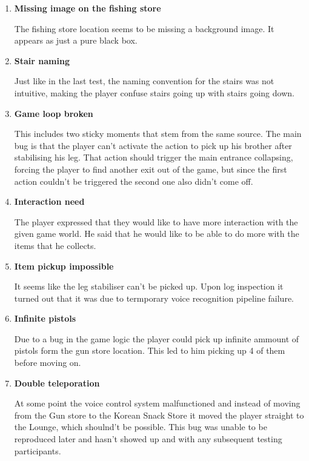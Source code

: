\begin{enumerate}
    \item \textbf{Missing image on the fishing store}
    
    The fishing store location seems to be missing a background image. It appears as just a pure black box.

    \item \textbf{Stair naming}
    
    Just like in the last test, the naming convention for the stairs was not intuitive, making the player confuse stairs going up with stairs going down.


    \item \textbf{Game loop broken}
    
    This includes two sticky moments that stem from the same source. The main bug is that the player can't activate the action to pick up his brother after stabilising his leg. That action should trigger the main entrance collapsing, forcing the player to find another exit out of the game, but since the first action couldn't be triggered the second one also didn't come off. 


    \item \textbf{Interaction need}
    
    The player expressed that they would like to have more interaction with the given game world. He said that he would like to be able to do more with the items that he collects. 



    \item \textbf{Item pickup impossible}
    
    It seems like the leg stabiliser can't be picked up. Upon log inspection it turned out that it was due to termporary voice recognition pipeline failure.


    \item \textbf{Infinite pistols}
    
    Due to a bug in the game logic the player could pick up infinite ammount of pistols form the gun store location. This led to him picking up 4 of them before moving on.


    \item \textbf{Double teleporation}
    
    At some point the voice control system malfunctioned and instead of moving from the Gun store to the Korean Snack Store it moved the player straight to the Lounge, which shoulnd't be possible. This bug was unable to be reproduced later and hasn't showed up and with any subsequent testing participants.

\end{enumerate}




